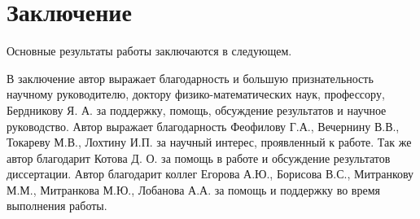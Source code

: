 \chapter*{Заключение}                       %


Основные результаты работы заключаются в следующем.



В заключение автор выражает благодарность и большую признательность
научному руководителю, доктору физико-математических наук, профессору,
Бердникову Я. А. за поддержку, помощь, обсуждение результатов и научное
руководство. Автор выражает благодарность Феофилову Г.А., Вечернину В.В.,
Токареву М.В., Лохтину И.П. за научный интерес, проявленный к работе. Так­
же автор благодарит Котова Д. О. за помощь в работе и обсуждение результатов диссертации. Автор благодарит коллег Егорова А.Ю., Борисова В.С., Митранкову М.М., Митранкова М.Ю.,  Лобанова А.А. за помощь и поддержку во время выполнения работы.


